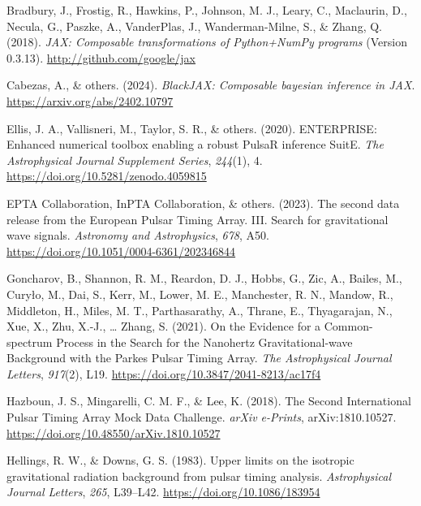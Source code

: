 \documentclass[
]{article}
\newlength{\cslhangindent}
\newenvironment{CSLReferences}[2] %
 {\begin{list}{}{%
  \setlength{\itemindent}{0pt}
  \setlength{\leftmargin}{0pt}
  \setlength{\parsep}{0pt}
  \ifodd #1
   \setlength{\leftmargin}{\cslhangindent}
   \setlength{\itemindent}{-1\cslhangindent}
  \fi
  \setlength{\itemsep}{#2\baselineskip}}}
 {\end{list}}
\begin{document}
\label{refs}
\begin{CSLReferences}{1}{0}
Bradbury, J., Frostig, R., Hawkins, P., Johnson, M. J., Leary, C.,
Maclaurin, D., Necula, G., Paszke, A., VanderPlas, J., Wanderman-Milne,
S., \& Zhang, Q. (2018). \emph{{JAX}: Composable transformations of
{P}ython+{N}um{P}y programs} (Version 0.3.13).
\url{http://github.com/google/jax}

Cabezas, A., \& others. (2024). \emph{BlackJAX: Composable bayesian
inference in JAX}. \url{https://arxiv.org/abs/2402.10797}

Ellis, J. A., Vallisneri, M., Taylor, S. R., \& others. (2020).
ENTERPRISE: Enhanced numerical toolbox enabling a robust PulsaR
inference SuitE. \emph{The Astrophysical Journal Supplement Series},
\emph{244}(1), 4. \url{https://doi.org/10.5281/zenodo.4059815}

EPTA Collaboration, InPTA Collaboration, \& others. (2023). {The second
data release from the European Pulsar Timing Array. III. Search for
gravitational wave signals}. \emph{Astronomy and Astrophysics},
\emph{678}, A50. \url{https://doi.org/10.1051/0004-6361/202346844}

Goncharov, B., Shannon, R. M., Reardon, D. J., Hobbs, G., Zic, A.,
Bailes, M., Curyło, M., Dai, S., Kerr, M., Lower, M. E., Manchester, R.
N., Mandow, R., Middleton, H., Miles, M. T., Parthasarathy, A., Thrane,
E., Thyagarajan, N., Xue, X., Zhu, X.-J., \ldots{} Zhang, S. (2021). {On
the Evidence for a Common-spectrum Process in the Search for the
Nanohertz Gravitational-wave Background with the Parkes Pulsar Timing
Array}. \emph{The Astrophysical Journal Letters}, \emph{917}(2), L19.
\url{https://doi.org/10.3847/2041-8213/ac17f4}

Hazboun, J. S., Mingarelli, C. M. F., \& Lee, K. (2018). {The Second
International Pulsar Timing Array Mock Data Challenge}. \emph{arXiv
e-Prints}, arXiv:1810.10527.
\url{https://doi.org/10.48550/arXiv.1810.10527}

Hellings, R. W., \& Downs, G. S. (1983). Upper limits on the isotropic
gravitational radiation background from pulsar timing analysis.
\emph{Astrophysical Journal Letters}, \emph{265}, L39--L42.
\url{https://doi.org/10.1086/183954}


\end{CSLReferences}
\end{document}
